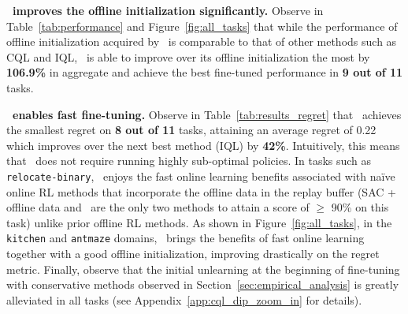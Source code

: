 \textbf{\methodname\ improves the offline initialization significantly.} Observe in Table~\ref{tab:performance} and Figure~\ref{fig:all_tasks} that while the performance of offline initialization acquired by \methodname\ is comparable to that of other methods such as CQL and IQL, \methodname\ is able to improve over its offline initialization the most by \textbf{106.9\%} in aggregate and achieve the best fine-tuned performance in \textbf{9 out of 11} tasks.

\textbf{\methodname\ enables fast fine-tuning.} 
Observe in Table~\ref{tab:results_regret} that \methodname\ achieves the smallest regret on \textbf{8 out of 11} tasks, attaining an average regret of 0.22 which improves over the next best method (IQL) by \textbf{42\%}. Intuitively, this means that \methodname\ does not require running highly sub-optimal policies. In tasks such as \texttt{relocate-binary}, \methodname\ enjoys the fast online learning benefits associated with na\"ive online RL methods that incorporate the offline data in the replay buffer (SAC + offline data and \methodname\ are the only two methods to  attain a score of $\geq$ 90\% on this task) unlike prior offline RL methods. As shown in Figure~\ref{fig:all_tasks}, in the \texttt{kitchen} and \texttt{antmaze} domains, \methodname\ brings the benefits of fast online learning together with a good offline initialization, improving drastically on the regret metric. Finally, observe that the initial unlearning at the beginning of fine-tuning with conservative methods observed in Section~\ref{sec:empirical_analysis} is greatly alleviated in all tasks (see Appendix~\ref{app:cql_dip_zoom_in} for details).


